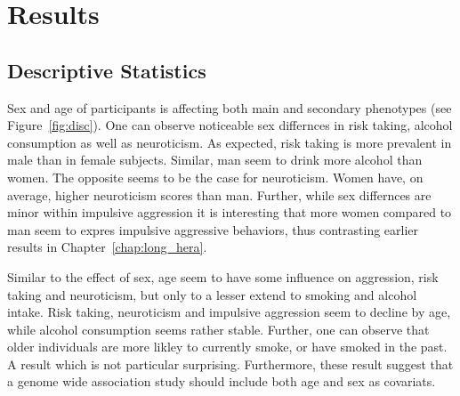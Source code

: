 \section{Results}
\label{sec:results_ukb_assoc}

\subsection{Descriptive Statistics}
\label{sub:descriptive_statistics}

Sex and age of participants is affecting both main and secondary phenotypes (see Figure~\ref{fig:disc}).
One can observe noticeable sex differnces in risk taking, alcohol consumption as well as neuroticism.
As expected, risk taking is more prevalent in male than in female subjects. 
Similar, man seem to drink more alcohol than women.
The opposite seems to be the case for neuroticism.
Women have, on average, higher neuroticism scores than man.
Further,  while sex differnces are minor within impulsive aggression it is interesting that more women compared to man seem to expres impulsive aggressive behaviors, thus contrasting earlier results in Chapter~\ref{chap:long_hera}. 

Similar to the effect of sex, age seem to have some influence on aggression, risk taking and neuroticism, but only to a lesser extend to smoking and alcohol intake.
Risk taking, neuroticism and impulsive aggression seem to decline by age, while alcohol consumption seems rather stable.
Further, one can observe that older individuals are more likley to currently smoke, or have smoked in the past.
A result which is not particular surprising.
Furthermore, these result suggest that a genome wide association study should include both age and sex as covariats.

